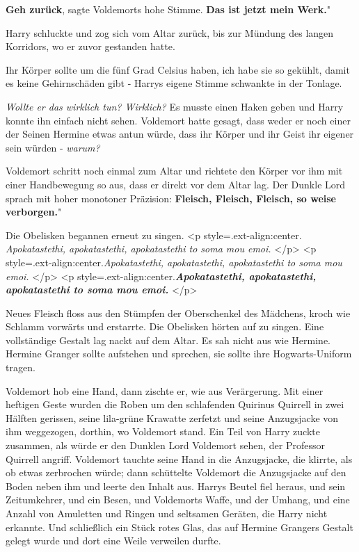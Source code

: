 \glqq \textbf{Geh zurück}\grqq{}, sagte Voldemorts hohe Stimme. \glqq
\textbf{Das ist jetzt mein Werk.}"

Harry schluckte und zog sich vom Altar zurück, bis zur Mündung des langen
Korridors, wo er zuvor gestanden hatte.

\glqq Ihr Körper sollte um die fünf Grad Celsius haben, ich habe sie so gekühlt,
damit es keine Gehirnschäden gibt -\grqq{} Harrys eigene Stimme schwankte in der
Tonlage.

\emph{Wollte er das wirklich tun? Wirklich?}
Es musste einen Haken geben und Harry konnte ihn einfach nicht sehen. Voldemort
hatte gesagt, dass weder er noch einer der Seinen Hermine etwas antun würde,
dass ihr Körper und ihr Geist ihr eigener sein würden - \emph{warum?}

Voldemort schritt noch einmal zum Altar und richtete den Körper vor ihm mit
einer Handbewegung so aus, dass er direkt vor dem Altar lag. Der Dunkle Lord
sprach mit hoher monotoner Präzision: \glqq \textbf{Fleisch, Fleisch, Fleisch,
so weise verborgen.}"

Die Obelisken begannen erneut zu singen. <p
style=\grqq{}.ext-align:center\grqq{}. \emph{Apokatastethi, apokatastethi,
apokatastethi to soma mou emoi. }</p> <p
style=\grqq{}.ext-align:center\grqq{}.\emph{Apokatastethi, apokatastethi,
apokatastethi to soma mou emoi. }</p> <p
style=\grqq{}.ext-align:center\grqq{}.\textbf{\emph{Apokatastethi,
apokatastethi, apokatastethi to soma mou emoi. }}</p>

Neues Fleisch floss aus den Stümpfen der Oberschenkel des Mädchens, kroch wie
Schlamm vorwärts und erstarrte. Die Obelisken hörten auf zu singen. Eine
vollständige Gestalt lag nackt auf dem Altar. Es sah nicht aus wie Hermine.
Hermine Granger sollte aufstehen und sprechen, sie sollte ihre Hogwarts-Uniform
tragen.

Voldemort hob eine Hand, dann zischte er, wie aus Verärgerung. Mit einer
heftigen Geste wurden die Roben um den schlafenden Quirinus Quirrell in zwei
Hälften gerissen, seine lila-grüne Krawatte zerfetzt und seine Anzugsjacke von
ihm weggezogen, dorthin, wo Voldemort stand. Ein Teil von Harry zuckte zusammen,
als würde er den Dunklen Lord Voldemort sehen, der Professor Quirrell angriff.
Voldemort tauchte seine Hand in die Anzugsjacke, die klirrte, als ob etwas
zerbrochen würde; dann schüttelte Voldemort die Anzugsjacke auf den Boden neben
ihm und leerte den Inhalt aus. Harrys Beutel fiel heraus, und sein Zeitumkehrer,
und ein Besen, und Voldemorts Waffe, und der Umhang, und eine Anzahl von
Amuletten und Ringen und seltsamen Geräten, die Harry nicht erkannte. Und
schließlich ein Stück rotes Glas, das auf Hermine Grangers Gestalt gelegt wurde
und dort eine Weile verweilen durfte.

